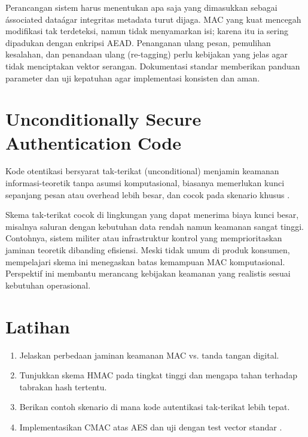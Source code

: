 \documentclass[../main.tex]{subfiles}
\begin{document}
Perancangan sistem harus menentukan apa saja yang dimasukkan sebagai \'associated data\' agar integritas metadata turut dijaga. MAC yang kuat mencegah modifikasi tak terdeteksi, namun tidak menyamarkan isi; karena itu ia sering dipadukan dengan enkripsi AEAD. Penanganan ulang pesan, pemulihan kesalahan, dan penandaan ulang (re-tagging) perlu kebijakan yang jelas agar tidak menciptakan vektor serangan. Dokumentasi standar memberikan panduan parameter dan uji kepatuhan agar implementasi konsisten dan aman.

\section{Unconditionally Secure Authentication Code}
Kode otentikasi bersyarat tak-terikat (unconditional) menjamin keamanan informasi-teoretik tanpa asumsi komputasional, biasanya memerlukan kunci sepanjang pesan atau overhead lebih besar, dan cocok pada skenario khusus \citep{menezes}.

Skema tak-terikat cocok di lingkungan yang dapat menerima biaya kunci besar, misalnya saluran dengan kebutuhan data rendah namun keamanan sangat tinggi. Contohnya, sistem militer atau infrastruktur kontrol yang memprioritaskan jaminan teoretik dibanding efisiensi. Meski tidak umum di produk konsumen, mempelajari skema ini menegaskan batas kemampuan MAC komputasional. Perspektif ini membantu merancang kebijakan keamanan yang realistis sesuai kebutuhan operasional.

\section{Latihan}
\begin{enumerate}
  \item Jelaskan perbedaan jaminan keamanan MAC vs. tanda tangan digital.
  \item Tunjukkan skema HMAC pada tingkat tinggi dan mengapa tahan terhadap tabrakan hash tertentu.
  \item Berikan contoh skenario di mana kode autentikasi tak-terikat lebih tepat.
  \item Implementasikan CMAC atas AES dan uji dengan test vector standar \citep{nist_sp_800_38b}.
\end{enumerate}
\end{document}
